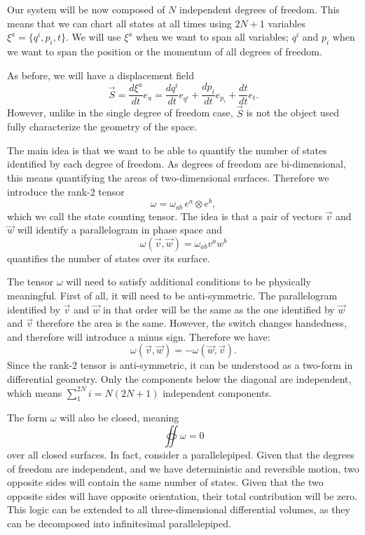 \documentclass[10pt,twocolumn, nofootinbib]{revtex4-2}
\begin{document}
Our system will be now composed of $N$ independent degrees of freedom. This means that we can chart all states at all times using $2N + 1$ variables $\xi^a = \{ q^i, p_i, t\}$. We will use $\xi^a$ when we want to span all variables; $q^i$ and $p_i$ when we want to span the position or the momentum of all degrees of freedom.

As before, we will have a displacement field
\begin{equation}
	\vec{S} = \frac{d\xi^a}{dt} e_{a} = \frac{dq^i}{dt} e_{q^i} + \frac{dp_i}{dt} e_{p_i} + \frac{dt}{dt} e_t.
\end{equation}
However, unlike in the single degree of freedom case, $\vec{S}$ is not the object used fully characterize the geometry of the space.

The main idea is that we want to be able to quantify the number of states identified by each degree of freedom. As degrees of freedom are bi-dimensional, this means quantifying the areas of two-dimensional surfaces. Therefore we introduce the rank-2 tensor
\begin{equation}
	\omega = \omega_{ab} \, e^a \otimes e^b,
\end{equation}
which we call the state counting tensor. The idea is that a pair of vectors $\vec{v}$ and $\vec{w}$ will identify a parallelogram in phase space and 
\begin{equation}
	\omega(\vec{v}, \vec{w}) = \omega_{ab} v^a w^b
\end{equation}
quantifies the number of states over its surface.

The tensor $\omega$ will need to satisfy additional conditions to be physically meaningful. First of all, it will need to be anti-symmetric. The parallelogram identified by $\vec{v}$ and $\vec{w}$ in that order will be the same as the one identified by $\vec{w}$ and $\vec{v}$ therefore the area is the same. However, the switch changes handedness, and therefore will introduce a minus sign. Therefore we have:
\begin{equation}
	\omega(\vec{v}, \vec{w}) = - \omega(\vec{w}, \vec{v}).
\end{equation}
Since the rank-2 tensor is anti-symmetric, it can be understood as a two-form in differential geometry. Only the components below the diagonal are independent, which means $\sum_1^{2N}i =N(2N+1)$ independent components.

The form $\omega$ will also be closed, meaning
\begin{equation}\label{mdof_closed_form}
	\oiint \omega = 0
\end{equation}
over all closed surfaces. In fact, consider a parallelepiped. Given that the degrees of freedom are independent, and we have deterministic and reversible motion, two opposite sides will contain the same number of states. Given that the two opposite sides will have opposite orientation, their total contribution will be zero. This logic can be extended to all three-dimensional differential volumes, as they can be decomposed into infinitesimal parallelepiped.
\end{document}
